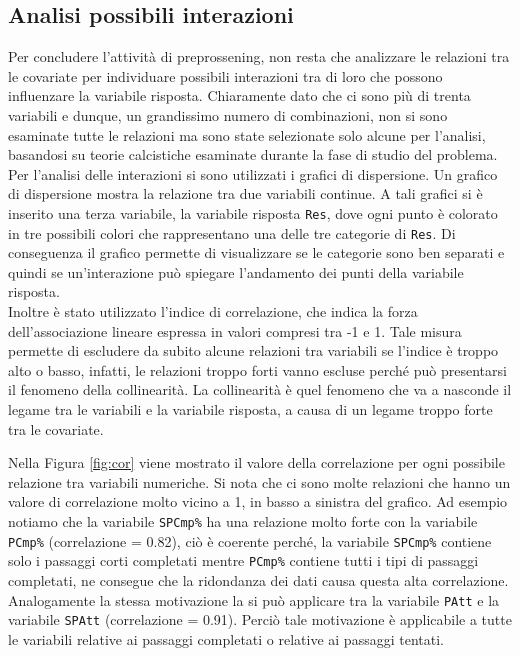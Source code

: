 \subsection{Analisi possibili interazioni} 
Per concludere l'attività di preprossening, non resta che analizzare le relazioni tra le covariate per individuare possibili interazioni tra di loro che possono influenzare la variabile risposta. Chiaramente dato che ci sono più di trenta variabili e dunque, un grandissimo numero di combinazioni, non si sono esaminate tutte le relazioni ma sono state selezionate solo alcune per l'analisi, basandosi su teorie calcistiche esaminate durante la fase di studio del problema.\\


Per l'analisi delle interazioni si sono utilizzati i grafici di dispersione. Un grafico di dispersione mostra la relazione tra due variabili continue. A tali grafici si è inserito una terza variabile, la variabile risposta \texttt{Res}, dove ogni punto è colorato in tre possibili colori che rappresentano una delle tre categorie di \texttt{Res}. Di conseguenza il grafico permette di visualizzare se le categorie sono ben separati e quindi se un'interazione può spiegare l'andamento dei punti della variabile risposta.\\
Inoltre è stato utilizzato l'indice di correlazione, che indica la forza dell'associazione lineare espressa in valori compresi tra -1 e 1. Tale misura permette di escludere da subito alcune relazioni tra variabili se l'indice è troppo alto o basso, infatti, le relazioni troppo forti vanno escluse perché può presentarsi il fenomeno della collinearità. 
La collinearità è quel fenomeno che va a nasconde il legame tra le variabili e la variabile risposta, a causa di un legame troppo forte tra le covariate.

Nella Figura \ref{fig:cor} viene mostrato il valore della correlazione per ogni possibile relazione tra variabili numeriche. Si nota che ci sono molte relazioni che hanno un valore di correlazione molto vicino a 1, in basso a sinistra del grafico. Ad esempio notiamo che la variabile \texttt{SPCmp\%} ha una relazione molto forte con la variabile \texttt{PCmp\%} (correlazione = 0.82), ciò è coerente perché, la variabile \texttt{SPCmp\%} contiene solo i passaggi corti completati mentre \texttt{PCmp\%} contiene tutti i tipi di passaggi completati, ne consegue che la ridondanza dei dati causa questa alta correlazione. Analogamente la stessa motivazione la si può applicare tra la variabile \texttt{PAtt} e la variabile \texttt{SPAtt} (correlazione = 0.91). Perciò tale motivazione è applicabile a tutte le variabili relative ai passaggi completati o relative ai passaggi tentati.

